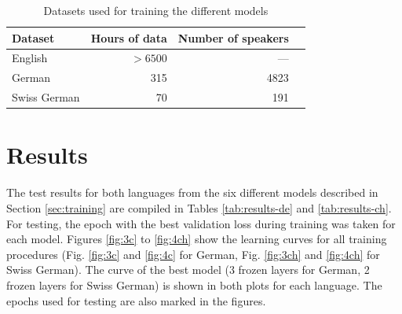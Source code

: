 \documentclass[11pt]{article}
\newcommand{\tz}[1]{\textcolor{red}{\textbf{TZ:} #1}}
\newcommand{\tz}[1]{}
\begin{document}
\begin{table}[ht]
    \centering
    \begin{tabular}{lrrr}
        \toprule
        Dataset & Hours of data & Number of speakers\\
        \midrule
        English & \(>6500\) & --- \\
        German & 315 & 4823 \\
        Swiss German & 70 & 191 \\
        \bottomrule
    \end{tabular}
    \caption{Datasets used for training the different models}
    \label{tab:datasets}
\end{table}

\section{Results}
The test results for both languages from the six different models described in Section \ref{sec:training} are compiled in Tables \ref{tab:results-de} and \ref{tab:results-ch}. For testing, the epoch with the best validation loss during training was taken for each model. %
Figures \ref{fig:3c} to \ref{fig:4ch} show the learning curves for all training procedures (Fig. \ref{fig:3c} and \ref{fig:4c} for German, Fig. \ref{fig:3ch} and \ref{fig:4ch} for Swiss German). The curve of the best model (3 frozen layers for German, 2 frozen layers for Swiss German) is shown in both plots for each language. The epochs used for testing are also marked in the figures.
\end{document}
